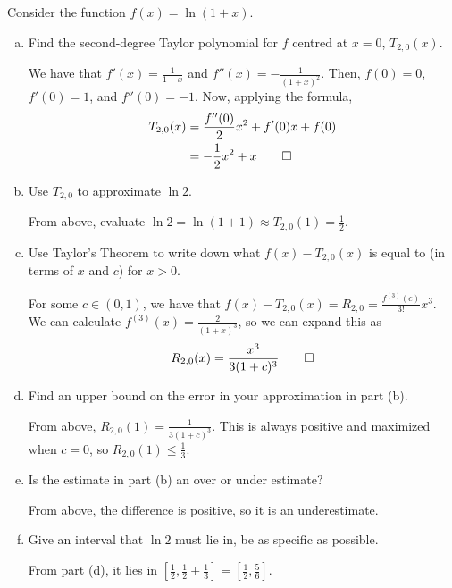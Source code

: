 \begin{prob} Consider the function $f(x) = \ln(1+x)$.
  \begin{enumerate}[(a)]
    \item Find the second-degree Taylor polynomial for $f$ centred at $x=0$, $T_{2,0}(x)$.
          \begin{sol}
            We have that $f'(x) = \frac{1}{1+x}$ and $f''(x) = -\frac{1}{(1+x)^2}$.
            Then, $f(0) = 0$, $f'(0) = 1$, and $f''(0) = -1$.
            Now, applying the formula,
            \begin{align*}
              T_{2,0}(x) & = \frac{f''(0)}{2}x^2 + f'(0)x + f(0) \\
                         & = -\frac{1}{2}x^2 + x \qedhere
            \end{align*}
          \end{sol}
    \item Use $T_{2,0}$ to approximate $\ln 2$.
          \begin{sol}
            From above, evaluate $\ln 2 = \ln(1+1) \approx T_{2,0}(1) = \frac12$.
          \end{sol}
    \item Use Taylor's Theorem to write down what $f(x) - T_{2,0}(x)$ is equal to
          (in terms of $x$ and $c$) for $x > 0$.
          \begin{sol}
            For some $c\in(0,1)$, we have that $f(x) - T_{2,0}(x) = R_{2,0} = \frac{f^{(3)}(c)}{3!}x^3$.
            We can calculate $f^{(3)}(x) = \frac{2}{(1+x)^3}$, so we can expand this as
            \[ R_{2,0}(x) = \frac{x^3}{3(1+c)^3} \qedhere \]
          \end{sol}
    \item Find an upper bound on the error in your approximation in part (b).
          \begin{sol}
            From above, $R_{2,0}(1) = \frac{1}{3(1+c)^3}$.
            This is always positive and maximized when $c=0$, so $R_{2,0}(1) \leq \frac{1}{3}$.
          \end{sol}
    \item Is the estimate in part (b) an over or under estimate?
          \begin{sol}
            From above, the difference is positive, so it is an underestimate.
          \end{sol}
    \item Give an interval that $\ln 2$ must lie in, be as specific as possible.
          \begin{sol}
            From part (d), it lies in $[\frac12,\frac12+\frac13] = [\frac12,\frac56]$.
          \end{sol}
  \end{enumerate}
\end{prob}

